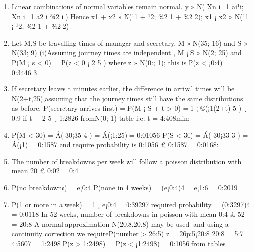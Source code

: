 \documentclass[a4paper,12pt]{article}
\begin{document}
\begin{enumerate}
    \item 
Linear combinations of normal variables remain normal.
y » N(
Xn
i=1
ai¹i;
Xn
i=1
a2
i ¾2
i )
Hence x1 + x2 » N(¹1 + ¹2; ¾2
1 + ¾2
2); x1 ¡ x2 » N(¹1 ¡ ¹2; ¾2
1 + ¾2
2)
\item Let M,S be travelling times of manager and secretary.
M » N(35; 16) and S » N(33; 9)
(i)Assuming journey times are independent ,
M ¡ S » N(2; 25) and P(M ¡ s < 0) = P(z <
0 ¡ 2
5
)
where z » N(0:; 1); this is P(z < ¡0:4) = 0:3446
3
\item If secretary leaves t minutes earlier, the difference in arrival times will be N(2+t,25),assuming
that the journey times still have the same distributions as before.
P(secretary arrives first) = P(M ¡ S + t > 0)
= 1 ¡ ©(¡1(2+t)
5 ) ¸ 0:9 if
t + 2
5
¸ 1:2826 fromN(0; 1) table i:e: t = 4:408min:
\item
P(M < 30) = Á( 30¡35
4 ) = Á(¡1:25) = 0:01056
P(S < 30) = Á( 30¡33
3 ) = Á(¡1) = 0:1587
and require probability is 0:1056 £ 0:1587 = 0:0168:
\item  The number of breakdowns per week will follow a poisson distribution with mean
20 £ 0:02 = 0:4
\item 
P(no breakdowns) = e¡0:4
P(none in 4 weeks) = (e¡0:4)4 = e¡1:6 = 0:2019
\item 
P(1 or more in a week) = 1 ¡ e¡0:4 = 0:39297
required probability = (0:3297)4 = 0:0118
In 52 weeks, number of breakdowns in poisson with mean 0:4 £ 52 = 20:8 A normal
approximation N(20.8,20.8) may be used, and using a continuity correction we
requireP(number > 26:5)
z = 26p:5¡20:8
20:8 = 5:7
4:5607 = 1:2498
P(z > 1:2498) = P(z < ¡1:2498) = 0:1056 from tables
\end{enumerate}
\end{document}
